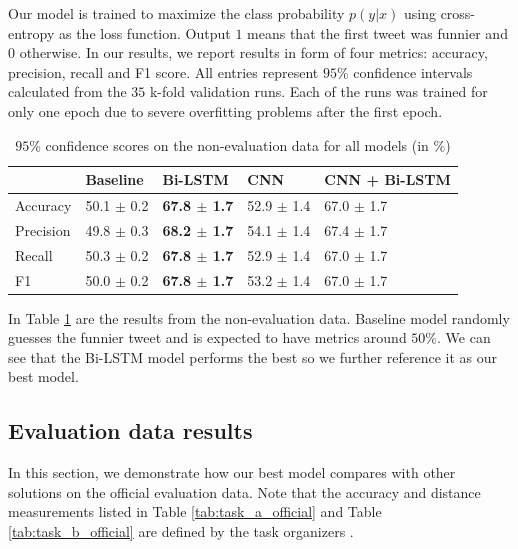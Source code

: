 \documentclass[10pt, a4paper]{article}
\begin{document}
Our model is trained to maximize the class probability $p(y \vert x)$ using
cross-entropy as the loss function. Output $1$ means that the first tweet was
funnier and $0$ otherwise. 
In our results, we report results in form of
four metrics: accuracy, precision, recall and F1 score. All entries represent
$95\%$ confidence intervals calculated from the $35$ k-fold validation runs.
Each of the runs was trained for only one epoch due to severe overfitting
problems after the first epoch.

\begin{table}
\scriptsize
    \caption{$95\%$ confidence scores on the non-evaluation data for all models
    (in $\%$)}
 \label{tab:conf_95_dev}
 \begin{center}
 \begin{tabular}{l|llll}
 \toprule
     & Baseline & Bi-LSTM & CNN & CNN + Bi-LSTM\\
 \midrule
     Accuracy & 50.1 $\pm$ 0.2 & \textbf{67.8 $\pm$ 1.7} & 52.9 $\pm$ 1.4  & 67.0 $\pm$
     1.7\\

     Precision & 49.8 $\pm$ 0.3 & \textbf{68.2 $\pm$ 1.7}  & 54.1 $\pm$ 1.4& 67.4 $\pm$ 1.7\\
     Recall & 50.3 $\pm$ 0.2 & \textbf{67.8 $\pm$ 1.7} & 52.9 $\pm$ 1.4& 67.0 $\pm$ 1.7\\

     F1 & 50.0 $\pm$ 0.2 & \textbf{67.8 $\pm$ 1.7}  & 53.2 $\pm$ 1.4 & 67.0 $\pm$ 1.7\\

 \bottomrule
 \end{tabular}
 \end{center}
\end{table}

In Table \ref{tab:conf_95_dev} are the results from the non-evaluation data.
Baseline model randomly guesses the funnier tweet and is expected to have
metrics around $50\%$. We can see that the Bi-LSTM model performs the best so
we further reference it as our best model.

\subsection{Evaluation data results}
In this section, we demonstrate how our best model compares with other solutions on the official
evaluation data. Note that the accuracy and distance measurements listed in
Table \ref{tab:task_a_official} and Table \ref{tab:task_b_official} are
defined by the task organizers \citep{potash2016hashtagwars}.
\end{document}
